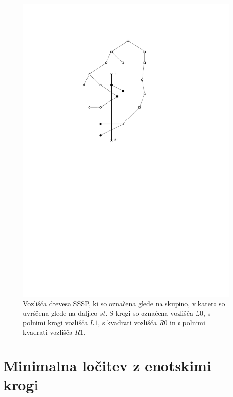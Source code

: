 \documentclass[a4paper, 12pt]{book}
\begin{document}
\begin{figure}
\centerline{\includegraphics{pics/categorization.pdf}}
\caption{Vozlišča drevesa SSSP, ki so označena glede na skupino, v katero so uvrščena glede na daljico $st$. S krogi so označena vozlišča $L0$, s polnimi krogi vozlišča $L1$, s kvadrati vozlišča $R0$ in s polnimi kvadrati vozlišča $R1$. }
\label{categorization}
\end{figure}

\section{Minimalna ločitev z enotskimi krogi}
\end{document}
